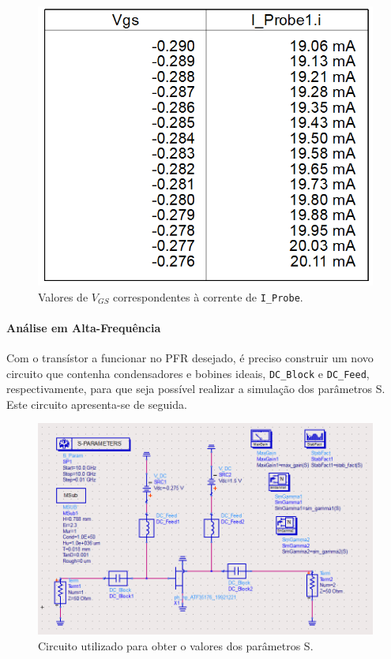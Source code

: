 \documentclass[11pt]{article}
\numberwithin{equation}{section}
\begin{document}
\begin{figure}[H]
	\centering
	\includegraphics[keepaspectratio=true, scale=0.27]{exps/Vgs}
	\vspace{-0.5em}
	\caption{Valores de $V_{GS}$ correspondentes à corrente de \texttt{I\_Probe}.}
	\label{fig:VGS}
	\vspace{-0.8em}
\end{figure} 

\paragraph{Análise em Alta-Frequência} \hspace{0pt} 

Com o transístor a funcionar no PFR desejado, é preciso construir um novo circuito que contenha condensadores e bobines ideais, \texttt{DC\_Block} e \texttt{DC\_Feed}, respectivamente, para que seja possível realizar a simulação dos parâmetros S. Este circuito apresenta-se de seguida.

\begin{figure}[H]
	\centering
	\includegraphics[keepaspectratio=true, scale=0.41]{exps/Circuito_1}
	\vspace{-0.5em}
	\caption{Circuito utilizado para obter o valores dos parâmetros S.}
	\label{fig:Circuito_1}
	\vspace{-0.8em}
\end{figure}
\end{document}
